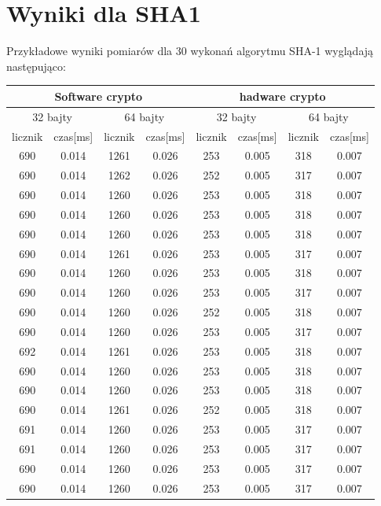 \documentclass[oneside]{mgr}
\begin{document}
\section{Wyniki dla SHA1}
Przykładowe wyniki pomiarów dla 30 wykonań algorytmu SHA-1 wyglądają następująco:
\begin{center}

\begin{tabular}{|c|c|c|c|c|c|c|c|}
\hline 
\multicolumn{4}{|c|}{Software crypto} & \multicolumn{4}{|c|}{hadware crypto} \\
\hline 
\multicolumn{2}{|c|}{32 bajty} & \multicolumn{2}{|c|}{64 bajty} & \multicolumn{2}{|c|}{32 bajty} & \multicolumn{2}{|c|}{64 bajty} \\
\hline 
licznik & czas[ms] & licznik & czas[ms] & licznik & czas[ms] & licznik & czas[ms] \\
\hline 
690 &	0.014 &	1261 &	0.026 &	253 &	0.005 &	318 &	0.007 \\
690 &	0.014 &	1262 &	0.026 &	252 &	0.005 &	317 &	0.007 \\
690 &	0.014 &	1260 &	0.026 &	253 &	0.005 &	318 &	0.007 \\
690 &	0.014 &	1260 &	0.026 &	253 &	0.005 &	318 &	0.007 \\
690 &	0.014 &	1260 &	0.026 &	253 &	0.005 &	318 &	0.007 \\
690 &	0.014 &	1261 &	0.026 &	253 &	0.005 &	317 &	0.007 \\
690 &	0.014 &	1260 &	0.026 &	253 &	0.005 &	318 &	0.007 \\
690 &	0.014 &	1260 &	0.026 &	253 &	0.005 &	317 &	0.007 \\
690 &	0.014 &	1260 &	0.026 &	252 &	0.005 &	318 &	0.007 \\
690 &	0.014 &	1260 &	0.026 &	253 &	0.005 &	317 &	0.007 \\
692 &	0.014 &	1261 &	0.026 &	253 &	0.005 &	318 &	0.007 \\
690 &	0.014 &	1260 &	0.026 &	253 &	0.005 &	318 &	0.007 \\
690 &	0.014 &	1260 &	0.026 &	253 &	0.005 &	318 &	0.007 \\
690 &	0.014 &	1261 &	0.026 &	252 &	0.005 &	318 &	0.007 \\
691 &	0.014 &	1260 &	0.026 &	253 &	0.005 &	317 &	0.007 \\
691 &	0.014 &	1260 &	0.026 &	253 &	0.005 &	317 &	0.007 \\
690 &	0.014 &	1260 &	0.026 &	253 &	0.005 &	317 &	0.007 \\
690 &	0.014 &	1260 &	0.026 &	253 &	0.005 &	317 &	0.007 \\

\end{tabular}
\end{center}
\end{document}
